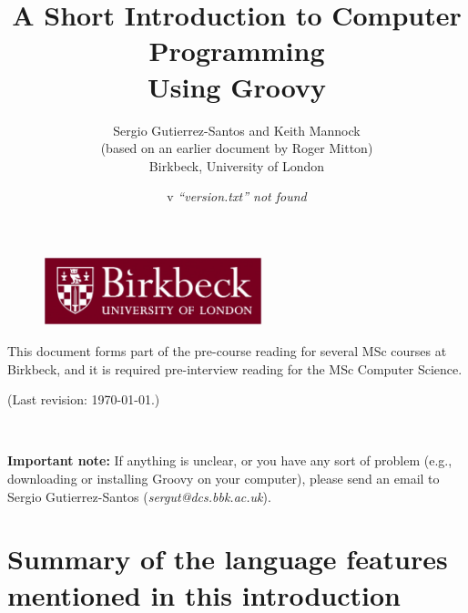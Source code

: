 \documentclass[11pt,a4paper]{article}
\title{A Short Introduction to Computer Programming\\
  Using Groovy}
\author{Sergio Gutierrez-Santos and Keith Mannock\\
  (based on an earlier document by Roger Mitton)\\
  Birkbeck, University of London}
\date{\InputIfFileExists{version.txt}
     {v}
     {\emph{``version.txt'' not found}}}
\begin{document}

\maketitle

\thispagestyle{empty}

\vfill 

\begin{figure}[h!]  %
  \centering
  \includegraphics[height=2cm]{bbk.eps}
\end{figure}

\vfill

\noindent This document forms part of the pre-course reading for
several MSc courses at Birkbeck, and it is required pre-interview
reading for the MSc Computer Science.


\noindent (Last revision: \today.)


\newpage

~\vspace{8cm}

\textbf{Important note: } If anything is unclear, or you have any 
sort of problem (e.g.,
downloading or installing Groovy on your computer), please send an
email to Sergio Gutierrez-Santos (\emph{sergut@dcs.bbk.ac.uk}).
\newpage


\newpage


\newpage


\newpage


\newpage


\newpage

\section{Summary of the language features mentioned in this introduction}

\newpage


\end{document}
